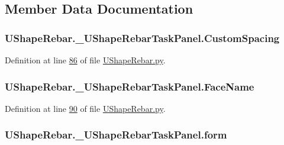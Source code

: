 \subsection{Member Data Documentation}
\subsubsection[{\texorpdfstring{Custom\+Spacing}{CustomSpacing}}]{\setlength{\rightskip}{0pt plus 5cm}U\+Shape\+Rebar.\+\_\+\+U\+Shape\+Rebar\+Task\+Panel.\+Custom\+Spacing}\hypertarget{classUShapeRebar_1_1__UShapeRebarTaskPanel_abb7e05e650f1e52e878b0d74be1c9abd}{}\label{classUShapeRebar_1_1__UShapeRebarTaskPanel_abb7e05e650f1e52e878b0d74be1c9abd}


Definition at line \hyperlink{UShapeRebar_8py_source_l00086}{86} of file \hyperlink{UShapeRebar_8py_source}{U\+Shape\+Rebar.\+py}.

\subsubsection[{\texorpdfstring{Face\+Name}{FaceName}}]{\setlength{\rightskip}{0pt plus 5cm}U\+Shape\+Rebar.\+\_\+\+U\+Shape\+Rebar\+Task\+Panel.\+Face\+Name}\hypertarget{classUShapeRebar_1_1__UShapeRebarTaskPanel_abc34324a2e2e788d505002fec92ab78f}{}\label{classUShapeRebar_1_1__UShapeRebarTaskPanel_abc34324a2e2e788d505002fec92ab78f}


Definition at line \hyperlink{UShapeRebar_8py_source_l00090}{90} of file \hyperlink{UShapeRebar_8py_source}{U\+Shape\+Rebar.\+py}.

\subsubsection[{\texorpdfstring{form}{form}}]{\setlength{\rightskip}{0pt plus 5cm}U\+Shape\+Rebar.\+\_\+\+U\+Shape\+Rebar\+Task\+Panel.\+form}\hypertarget{classUShapeRebar_1_1__UShapeRebarTaskPanel_a6f9058a758e84681c44f1abd37d95742}{}\label{classUShapeRebar_1_1__UShapeRebarTaskPanel_a6f9058a758e84681c44f1abd37d95742}


